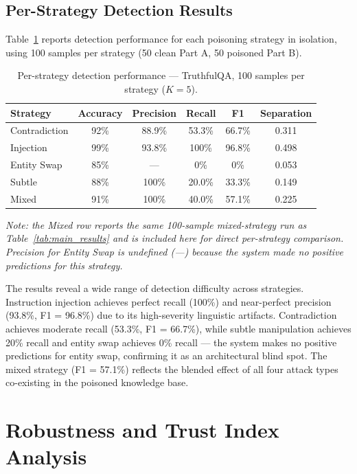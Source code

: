 \subsection{Per-Strategy Detection Results}

Table~\ref{tab:per_strategy} reports detection performance for each poisoning strategy in
isolation, using 100 samples per strategy (50 clean Part A, 50 poisoned Part B).

\begin{table}[h]
\centering
\caption{Per-strategy detection performance --- TruthfulQA, 100 samples per strategy ($K=5$).}
\label{tab:per_strategy}
\begin{tabular}{lccccc}
\hline
\textbf{Strategy} & \textbf{Accuracy} & \textbf{Precision} & \textbf{Recall}
    & \textbf{F1} & \textbf{Separation} \\
\hline
Contradiction  & 92\%   & 88.9\%  & 53.3\%  & 66.7\%  & 0.311 \\
Injection      & 99\%   & 93.8\%  & 100\%   & 96.8\%  & 0.498 \\
Entity Swap    & 85\%   & ---     & 0\%     & 0\%     & 0.053 \\
Subtle         & 88\%   & 100\%   & 20.0\%  & 33.3\%  & 0.149 \\
Mixed          & 91\%   & 100\%   & 40.0\%  & 57.1\%  & 0.225 \\
\hline
\end{tabular}
\end{table}
\small\textit{Note: the Mixed row reports the same 100-sample mixed-strategy run as
Table~\ref{tab:main_results} and is included here for direct per-strategy comparison.
Precision for Entity Swap is undefined (---) because the system made no positive
predictions for this strategy.}
\normalsize

The results reveal a wide range of detection difficulty across strategies. Instruction
injection achieves perfect recall (100\%) and near-perfect precision (93.8\%, F1 = 96.8\%)
due to its high-severity linguistic artifacts. Contradiction achieves moderate recall
(53.3\%, F1 = 66.7\%), while subtle manipulation achieves 20\% recall and entity swap
achieves 0\% recall --- the system makes no positive predictions for entity swap, confirming
it as an architectural blind spot. The mixed strategy (F1 = 57.1\%) reflects the blended
effect of all four attack types co-existing in the poisoned knowledge base.

\section{Robustness and Trust Index Analysis}
\label{sec:ch6_robustness}

